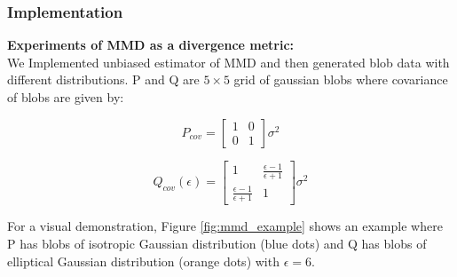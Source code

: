\documentclass{article}
\begin{document}
\subsubsection*{Implementation}
\textbf{Experiments of MMD as a divergence metric:}\\
We Implemented unbiased estimator of MMD and then generated blob data with different distributions. P and Q are \(5 \times 5\) grid of gaussian blobs where covariance of blobs are given by: \\
\begin{minipage}{0.45\linewidth}
\[
  P_{cov} = \begin{bmatrix}
    1 & 0 \\
    0 & 1
  \end{bmatrix}\sigma^2
\]
\end{minipage}
\hfill
\begin{minipage}{0.45\linewidth}
\[
  Q_{cov}(\epsilon) = \begin{bmatrix}
    1 & \frac{\epsilon-1}{\epsilon+1} \\
    \frac{\epsilon-1}{\epsilon+1} & 1
  \end{bmatrix} \sigma^2
\]
\end{minipage}

For a visual demonstration, Figure \ref{fig:mmd_example} shows an example where P has blobs of isotropic Gaussian distribution (blue dots) and Q has blobs of elliptical Gaussian distribution (orange dots) with \(\epsilon = 6\). 
\end{document}
